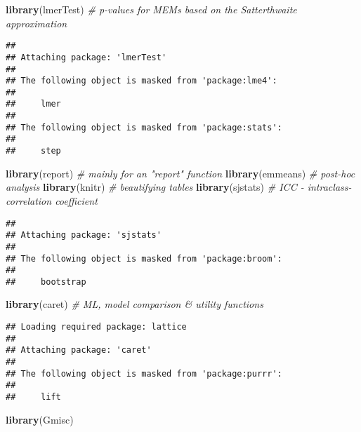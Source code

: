 \documentclass[
]{article}
\newenvironment{Shaded}{\begin{snugshade}}{\end{snugshade}}
\newcommand{\CommentTok}[1]{\textcolor[rgb]{0.56,0.35,0.01}{\textit{#1}}}
\newcommand{\FunctionTok}[1]{\textcolor[rgb]{0.13,0.29,0.53}{\textbf{#1}}}
\newcommand{\NormalTok}[1]{#1}
\begin{document}
\begin{Shaded}
\begin{Highlighting}[]
\FunctionTok{library}\NormalTok{(lmerTest) }\CommentTok{\# p{-}values for MEMs based on the Satterthwaite approximation}
\end{Highlighting}
\end{Shaded}

\begin{verbatim}
## 
## Attaching package: 'lmerTest'
## 
## The following object is masked from 'package:lme4':
## 
##     lmer
## 
## The following object is masked from 'package:stats':
## 
##     step
\end{verbatim}

\begin{Shaded}
\begin{Highlighting}[]
\FunctionTok{library}\NormalTok{(report) }\CommentTok{\# mainly for an "report" function}
\FunctionTok{library}\NormalTok{(emmeans) }\CommentTok{\# post{-}hoc analysis}
\FunctionTok{library}\NormalTok{(knitr) }\CommentTok{\# beautifying tables}
\FunctionTok{library}\NormalTok{(sjstats) }\CommentTok{\# ICC {-} intraclass{-}correlation coefficient}
\end{Highlighting}
\end{Shaded}

\begin{verbatim}
## 
## Attaching package: 'sjstats'
## 
## The following object is masked from 'package:broom':
## 
##     bootstrap
\end{verbatim}

\begin{Shaded}
\begin{Highlighting}[]
\FunctionTok{library}\NormalTok{(caret) }\CommentTok{\# ML, model comparison \& utility functions}
\end{Highlighting}
\end{Shaded}

\begin{verbatim}
## Loading required package: lattice
## 
## Attaching package: 'caret'
## 
## The following object is masked from 'package:purrr':
## 
##     lift
\end{verbatim}

\begin{Shaded}
\begin{Highlighting}[]
\FunctionTok{library}\NormalTok{(Gmisc)}
\end{Highlighting}
\end{Shaded}
\end{document}
